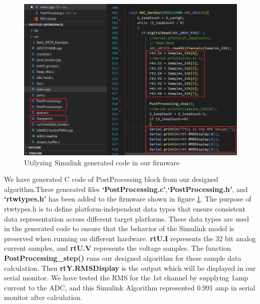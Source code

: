  \begin{figure}[htbp]
\centering
\includegraphics[scale=0.6]{images/RMS Calculation.PNG}
\caption{Utilyzing Simulink generated code in our firmware}
\label{fig:x Algorithm RMS}
\end{figure}

We have generated C code of PostProcessing block from our designed algorithm.Three generated files \textbf{‘PostProcessing.c’},\textbf{‘PostProcessing.h’}, and \textbf{‘rtwtypes.h’} has been added to the firmware shown in figure \ref{fig:x Algorithm RMS}. The purpose of rtwtypes.h is to define platform-independent data types that ensure consistent data representation across different target platforms. These data types are used in the generated code to ensure that the behavior of the Simulink model is preserved when running on different hardware. \textbf{rtU.I} represents the 32 bit analog current samples, and \textbf{rtU.V} represents the voltage samples. The function \textbf{PostProcessing\_step()} runs our designed algorithm for these sample data calculation. Then \textbf{rtY.RMSDisplay} is the output which will be displayed in our serial monitor. We have tested the RMS for the 1st channel by supplying 1amp current to the ADC, and this Simulink Algorithm represented 0.991 amp in serial monitor after calculation.




